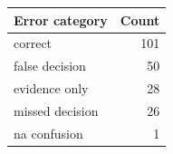 \begin{tabular}{lr}\toprule
Error category & Count \\\midrule
correct & 101 \\
false decision & 50 \\
evidence only & 28 \\
missed decision & 26 \\
na confusion & 1 \\
\bottomrule\end{tabular}

